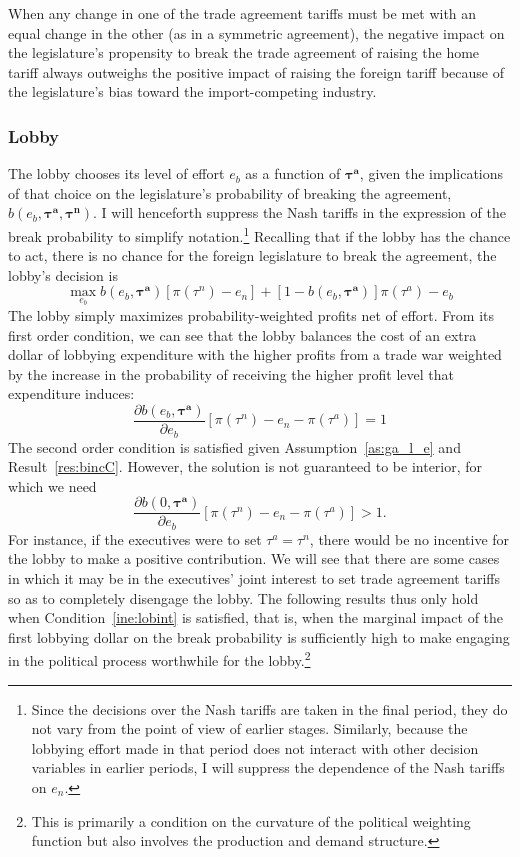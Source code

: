 \documentclass[10pt]{article}
\newcommand{\bta}{\bm{\tau^a}}
\newcommand{\btn}{\bm{\tau^n}}
\begin{document}
\noindent When any change in one of the trade agreement tariffs must be met with an equal change in the other (as in a symmetric agreement), the negative impact on the legislature's propensity to break the trade agreement of raising the home tariff always outweighs the positive impact of raising the foreign tariff because of the legislature's bias toward the import-competing industry.

\subsubsection{Lobby}
\label{sec:lob_un}
The lobby chooses its level of effort $e_b$ as a function of $\bta$, given the implications of that choice on the legislature's probability of breaking the agreement, $b(e_b,\bta,\btn)$. I will henceforth suppress the Nash tariffs in the expression of the break probability to simplify notation.\footnote{Since the decisions over the Nash tariffs are taken in the final period, they do not vary from the point of view of earlier stages. Similarly, because the lobbying effort made in that period does not interact with other decision variables in earlier periods, I will suppress the dependence of the Nash tariffs on $e_n$.} Recalling that if the lobby has the chance to act, there is no chance for the foreign legislature to break the agreement, the lobby's decision is
\[
  \max_{e_b} b(e_b,\bta) \left[\pi(\tau^n) - e_n \right] + [1 - b(e_b,\bta)] \pi(\tau^a) - e_b
\]
The lobby simply maximizes probability-weighted profits net of effort. From its first order condition, we can see that the lobby balances the cost of an extra dollar of lobbying expenditure with the higher profits from a trade war weighted by the increase in the probability of receiving the higher profit level that expenditure induces:
\begin{equation}
	\frac{\partial b(e_b,\bta)}{\partial e_b} \left[ \pi(\tau^n) -e_n - \pi(\tau^a) \right] = 1 
	\label{eq:lobbyfoc}
\end{equation}
The second order condition is satisfied given Assumption~\ref{as:ga_l_e} and Result~\ref{res:bincC}. However, the solution is not guaranteed to be interior, for which we need
  \begin{equation}
	  \frac{\partial b(0,\bta)}{\partial e_b} \left[ \pi(\tau^n) -e_n- \pi(\tau^a) \right] > 1.
		\label{ine:lobint}	
  \end{equation}
For instance, if the executives were to set $\tau^a = \tau^n$, there would be no incentive for the lobby to make a positive contribution. We will see that there are some cases in which it may be in the executives' joint interest to set trade agreement tariffs so as to completely disengage the lobby. The following results thus only hold when Condition~\ref{ine:lobint} is satisfied, that is, when the marginal impact of the first lobbying dollar on the break probability is sufficiently high to make engaging in the political process worthwhile for the lobby.\footnote{This is primarily a condition on the curvature of the political weighting function but also involves the production and demand structure.}
  
\end{document}
